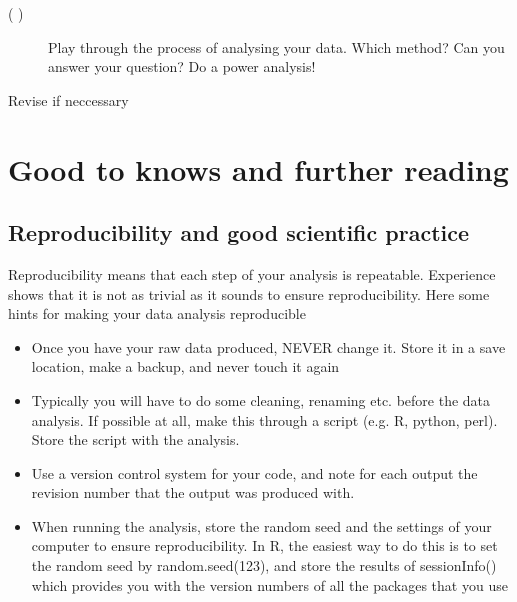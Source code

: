 \documentclass[a4paper,twoside]{tufte-book}\usepackage[]{graphicx}\usepackage[]{color}
\begin{document}
{\begin{mdframed}
\begin{description}
\begin{description}
  \item[( )] Play through the process of analysing your data. Which method? Can you answer your question? Do a power analysis!

  \end{description}


\item[( )] Revise if neccessary

\end{description}

\end{mdframed}


\chapter{Good to knows and further reading}

\section{Reproducibility and good scientific practice}

Reproducibility means that each step of your analysis is repeatable. Experience shows that it is not as trivial as it sounds to ensure reproducibility. Here some hints for making your data analysis reproducible

\begin{itemize}

\item{Once you have your raw data produced, NEVER change it. Store it in a save location, make a backup, and never touch it again}

\item{Typically you will have to do some cleaning, renaming etc. before the data analysis. If possible at all, make this through a script (e.g. R, python, perl). Store the script with the analysis.}

\item{Use a version control system for your code, and note for each output the revision number that the output was produced with.} 

\item{When running the analysis, store the random seed and the settings of your computer to ensure reproducibility. In R, the easiest way to do this is to set the random seed by random.seed(123), and store the results of sessionInfo() which provides you with the version numbers of all the packages that you use}


\end{itemize}}
\end{document}
